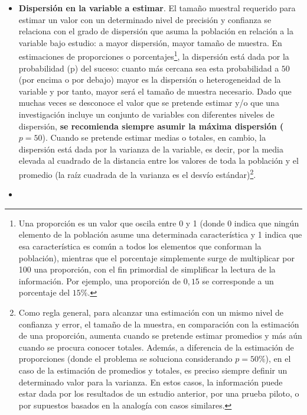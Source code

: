 \documentclass[
]{book}
\begin{document}
\begin{itemize}
\item
  \textbf{Dispersión en la variable a estimar}. El tamaño muestral requerido para estimar un valor con un determinado nivel de precisión y confianza se relaciona con el grado de dispersión que asuma la población en relación a la variable bajo estudio: a mayor dispersión, mayor tamaño de muestra. En estimaciones de proporciones o porcentajes\footnote{Una proporción es un valor que oscila entre 0 y 1 (donde 0 indica que ningún elemento de la población asume una determinada característica y 1 indica que esa característica es común a todos los elementos que conforman la población), mientras que el porcentaje simplemente surge de multiplicar por 100 una proporción, con el fin primordial de simplificar la lectura de la información. Por ejemplo, una proporción de \(0,15\) se corresponde a un porcentaje del \(15\%\).}, la dispersión está dada por la probabilidad (p) del suceso: cuanto más cercana sea esta probabilidad a \(50%
  \) (por encima o por debajo) mayor es la dispersión o heterogeneidad de la variable y por tanto, mayor será el tamaño de muestra necesario. Dado que muchas veces se desconoce el valor que se pretende estimar y/o que una investigación incluye un conjunto de variables con diferentes niveles de dispersión, \textbf{se recomienda siempre asumir la máxima dispersión (}\(p=50%
  \)). Cuando se pretende estimar medias o totales, en cambio, la dispersión está dada por la varianza de la variable, es decir, por la media elevada al cuadrado de la distancia entre los valores de toda la población y el promedio (la raíz cuadrada de la varianza es el desvío estándar)\footnote{Como regla general, para alcanzar una estimación con un mismo nivel de confianza y error, el tamaño de la muestra, en comparación con la estimación de una proporción, aumenta cuando se pretende estimar promedios y más aún cuando se procura conocer totales. Además, a diferencia de la estimación de proporciones (donde el problema se soluciona considerando \(p=50\%\)), en el caso de la estimación de promedios y totales, es preciso siempre definir un determinado valor para la varianza. En estos casos, la información puede estar dada por los resultados de un estudio anterior, por una prueba piloto, o por supuestos basados en la analogía con casos similares.}.
\item

\end{itemize}
\end{document}
